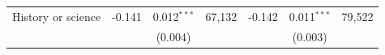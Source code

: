 \begin{tabular}{lcccccc}
\quad\quad\quad History or science & -0.141 & 0.012$^{***}$ & 67,132 & -0.142 & 0.011$^{***}$ & 79,522\\
 &  & (0.004) &  &  & (0.003) & \\
\bottomrule
\end{tabular}
